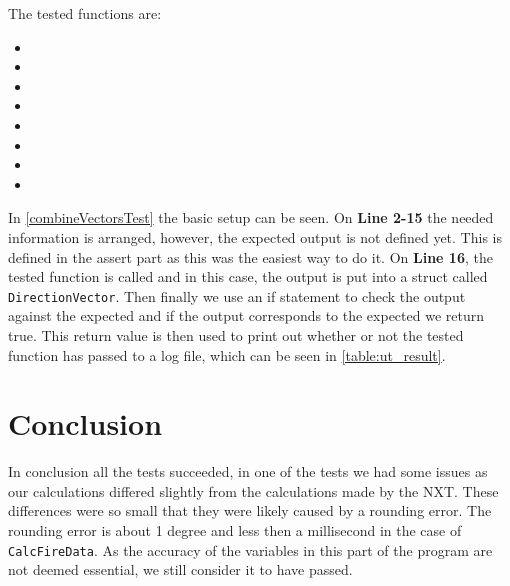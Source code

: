 The tested functions are:

\begin{itemize}
  \item {}
  \item {}
  \item {}
  \item {}
  \item {}
  \item {}
  \item {}
  \item {}
\end{itemize} 

In \autoref{combineVectorsTest} the basic setup can be seen. On \textbf{Line
2-15} the needed information is arranged, however, the expected output is not
defined yet. This is defined in the assert part as this was the easiest way to
do it. On \textbf{Line 16}, the tested function is called and in this case, the
output is put into a struct called \texttt{DirectionVector}. Then finally we use
an if statement to check the output against the expected and if the output
corresponds to the expected we return true. This return value is then used to
print out whether or not the tested function has passed to a log file, which can
be seen in \autoref{table:ut_result}.\nl


\section{Conclusion}
In conclusion all the tests succeeded, in one of the tests we had some
issues as our calculations differed slightly from the calculations made by the
NXT. These differences were so small that they were likely caused by a rounding
error. The rounding error is about 1 degree and less then a millisecond in the
case of \texttt{CalcFireData}. As the accuracy of the variables in this part
of the program are not deemed essential, we still consider it to have passed.
